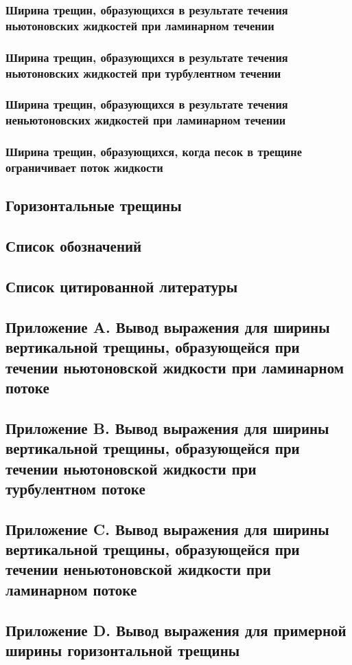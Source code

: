 \documentclass[a4paper, 12pt]{article}
\begin{document}
\subsubsection{Ширина трещин, образующихся в результате течения ньютоновских жидкостей при ламинарном течении}

\subsubsection{Ширина трещин, образующихся в результате течения ньютоновских жидкостей при турбулентном течении}

\subsubsection{Ширина трещин, образующихся в результате течения неньютоновских жидкостей при ламинарном течении}

\subsubsection{Ширина трещин, образующихся, когда песок в трещине ограничивает поток жидкости}

\subsection{Горизонтальные трещины}

\subsection{Список обозначений}

\subsection{Список цитированной литературы}

\subsection{Приложение A. Вывод выражения для ширины вертикальной трещины, образующейся при течении ньютоновской жидкости при ламинарном потоке}

\subsection{Приложение B. Вывод выражения для ширины вертикальной трещины, образующейся при течении ньютоновской жидкости при турбулентном потоке}

\subsection{Приложение C. Вывод выражения для ширины вертикальной трещины, образующейся при течении неньютоновской жидкости при ламинарном потоке}

\subsection{Приложение D. Вывод выражения для примерной ширины горизонтальной трещины}
\end{document}
